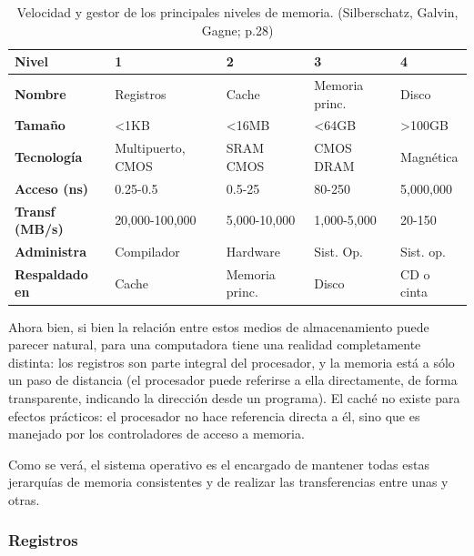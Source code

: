 \documentclass[11pt,fleqn]{book} %
\begin{document}
\begin{table}[htb]
\caption{Velocidad y gestor de los principales niveles de memoria. (Silberschatz, Galvin, Gagne; p.28)} 
\begin{center}
\begin{tabular}{lllll}
 Nivel                   &  1                  &  2               &  3               &  4           \\
\hline
 \textbf{Nombre}         &  Registros          &  Cache           &  Memoria princ.  &  Disco       \\
 \textbf{Tamaño}         &  <1KB               &  <16MB           &  <64GB           &  >100GB      \\
 \textbf{Tecnología}     &  Multipuerto, CMOS  &  SRAM CMOS       &  CMOS DRAM       &  Magnética   \\
 \textbf{Acceso (ns)}    &  0.25-0.5           &  0.5-25          &  80-250          &  5,000,000   \\
 \textbf{Transf (MB/s)}  &  20,000-100,000     &  5,000-10,000    &  1,000-5,000     &  20-150      \\
 \textbf{Administra}     &  Compilador         &  Hardware        &  Sist. Op.       &  Sist. op.   \\
 \textbf{Respaldado en}  &  Cache              &  Memoria princ.  &  Disco           &  CD o cinta  \\
\end{tabular}
\end{center}
\end{table}


Ahora bien, si bien la relación entre estos medios de almacenamiento
puede parecer natural, para una computadora tiene una
realidad completamente distinta: los registros son parte integral del
procesador, y la memoria está a sólo un paso de distancia (el
procesador puede referirse a ella directamente, de forma transparente,
indicando la dirección desde un programa). El caché no existe para
efectos prácticos: el procesador no hace referencia directa a él, sino
que es manejado por los controladores de acceso a memoria.

Como se verá, el sistema operativo es el encargado de mantener todas estas 
jerarquías de memoria consistentes y de realizar las transferencias entre unas 
y otras.
\subsubsection{Registros}
\label{sec-2-2-1-1}
\end{document}
